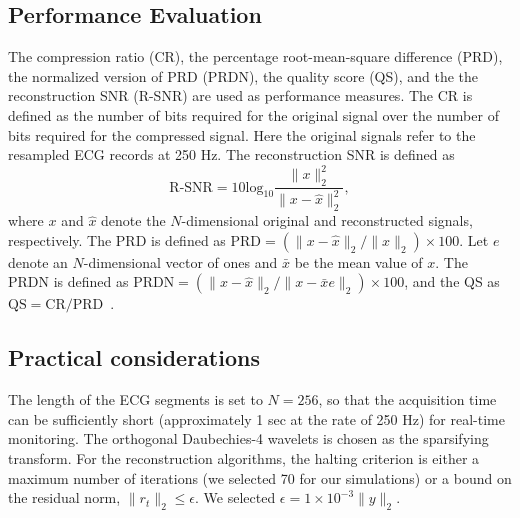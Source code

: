 \documentclass[journal]{IEEEtran}
\begin{document}
\subsection{Performance Evaluation}
The compression ratio (CR), the percentage root-mean-square difference (PRD), the normalized version of PRD (PRDN), the quality score (QS), and the the reconstruction SNR (R-SNR) are used as performance measures. The CR is defined as the number of bits required for the original signal over the number of bits required for the compressed signal. Here the original signals refer to the resampled ECG records at 250 Hz. The reconstruction SNR is defined as
\begin{equation}\label{BPD1807}
\text{R-SNR}=10\text{log}_{10}\frac{\|x\|_2^2}{\|x-\hat{x}\|_2^2},
\end{equation}
where $x$ and $\hat{x}$ denote the $N$-dimensional original and reconstructed signals, respectively. The PRD is defined as $\text{PRD}=(\|x-\hat{x}\|_2/\|x\|_2)\times100$. Let $e$ denote an $N$-dimensional vector of ones and $\bar{x}$ be the mean value of $x$. The PRDN is defined as $\text{PRDN}=(\|x-\hat{x}\|_2/\|x-\bar{x}e\|_2)\times100$, and the QS as $\text{QS}=\text{CR}/\text{PRD}$~\cite{Fira08}.

\subsection{Practical considerations}
The length of the ECG segments is set to $N=256$, so that the acquisition time can be sufficiently short (approximately 1 sec at the rate of 250 Hz) for real-time monitoring. The orthogonal Daubechies-4 wavelets is chosen as the sparsifying transform. For the reconstruction algorithms, the halting criterion is either a maximum number of iterations (we selected 70 for our simulations) or a bound on the residual norm, $\|r_t\|_2\leq \epsilon$. We selected $\epsilon=1\times10^{-3}\|y\|_2$.
\end{document}
